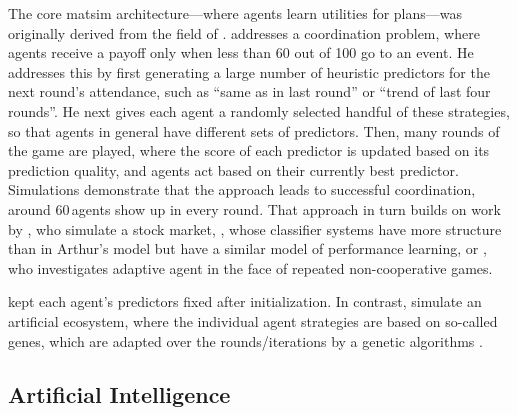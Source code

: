 The core \gls{matsim} architecture---where agents learn utilities for plans---was originally derived from the field of  \citep[e.g.][]{AxelrodBook,Holland_1992,HraberJonesForrestEcho,PalmerEtAl_PhysicaD_1994}. 
%
\citet{ArthurBar} addresses a coordination problem, where agents receive a payoff only when less than 60 out of 100 go to an event.  He addresses this by first generating a large number of heuristic predictors for the next round's attendance, such as ``same as in last round'' or ``trend of last four rounds''.  He next gives each agent a randomly selected handful of these strategies, so that agents in general have different sets of predictors.  Then, many rounds of the game are played, where the score of each predictor is updated based on its prediction quality,  
and agents act based on their currently best predictor.  Simulations demonstrate that the approach leads to successful coordination, \ie around 60\,agents show up in every round.
%
That approach in turn builds on work by \cite{PalmerEtAl_PhysicaD_1994}, who simulate a stock market, \citet{Holland_1992}, whose classifier systems have more structure than in Arthur's model but have a similar model of performance learning, or \cite{AxelrodBook}, who investigates adaptive agent in the face of repeated non-cooperative games.  

\citet{ArthurBar} kept each agent's predictors fixed after initialization.  In contrast,
\citet{HraberJonesForrestEcho} simulate an artificial ecosystem, where the individual agent strategies are based on so-called genes, which are adapted over the rounds/iterations by a genetic algorithms \citep{Goldberg_1989}.

\subsection{Artificial Intelligence}
\label{sec:artif-intell}

